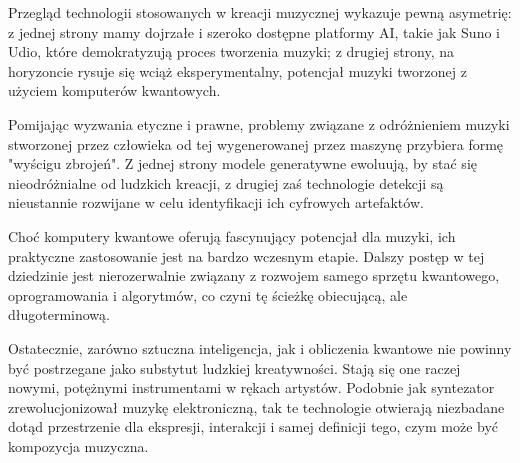 Przegląd technologii stosowanych w kreacji muzycznej wykazuje pewną asymetrię: z jednej strony mamy dojrzałe i szeroko dostępne platformy AI, takie jak Suno i Udio, które demokratyzują proces tworzenia muzyki; z drugiej strony, na horyzoncie rysuje się wciąż eksperymentalny, potencjał muzyki tworzonej z użyciem komputerów kwantowych.

Pomijając wyzwania etyczne i prawne, problemy związane z odróżnieniem muzyki stworzonej przez człowieka od tej wygenerowanej przez maszynę przybiera formę "wyścigu zbrojeń". Z jednej strony modele generatywne ewoluują, by stać się nieodróżnialne od ludzkich kreacji, z drugiej zaś technologie detekcji są nieustannie rozwijane w celu identyfikacji ich cyfrowych artefaktów.

Choć komputery kwantowe oferują fascynujący potencjał dla muzyki, ich praktyczne zastosowanie jest na bardzo wczesnym etapie. Dalszy postęp w tej dziedzinie jest nierozerwalnie związany z rozwojem samego sprzętu kwantowego, oprogramowania i algorytmów, co czyni tę ścieżkę obiecującą, ale długoterminową.

Ostatecznie, zarówno sztuczna inteligencja, jak i obliczenia kwantowe nie powinny być postrzegane jako substytut ludzkiej kreatywności. Stają się one raczej nowymi, potężnymi instrumentami w rękach artystów. Podobnie jak syntezator zrewolucjonizował muzykę elektroniczną, tak te technologie otwierają niezbadane dotąd przestrzenie dla ekspresji, interakcji i samej definicji tego, czym może być kompozycja muzyczna.

